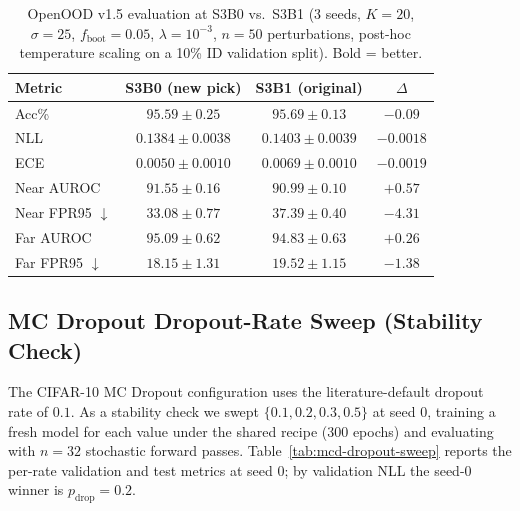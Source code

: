 \begin{table}[h]
\centering
\caption{OpenOOD v1.5 evaluation at S3B0 vs.\ S3B1 (3 seeds, $K = 20$,
$\sigma = 25$, $f_{\text{boot}} = 0.05$, $\lambda = 10^{-3}$, $n = 50$
perturbations, post-hoc temperature scaling on a 10\% ID validation split).
Bold = better.}
\label{tab:pnc-s3b0-vs-s3b1-ood}
\small
\begin{tabular}{l c c c}
\toprule
Metric & S3B0 (new pick) & S3B1 (original) & $\Delta$ \\
\midrule
Acc\%        & $95.59 \pm 0.25$  & $\mathbf{95.69 \pm 0.13}$    & $-0.09$ \\
NLL          & $\mathbf{0.1384 \pm 0.0038}$ & $0.1403 \pm 0.0039$ & $-0.0018$ \\
ECE          & $\mathbf{0.0050 \pm 0.0010}$ & $0.0069 \pm 0.0010$ & $-0.0019$ \\
Near AUROC   & $\mathbf{91.55 \pm 0.16}$    & $90.99 \pm 0.10$    & $+0.57$ \\
Near FPR95 $\downarrow$ & $\mathbf{33.08 \pm 0.77}$ & $37.39 \pm 0.40$ & $-4.31$ \\
Far AUROC    & $\mathbf{95.09 \pm 0.62}$    & $94.83 \pm 0.63$    & $+0.26$ \\
Far FPR95 $\downarrow$  & $\mathbf{18.15 \pm 1.31}$ & $19.52 \pm 1.15$ & $-1.38$ \\
\bottomrule
\end{tabular}
\end{table}

\subsection{MC Dropout Dropout-Rate Sweep (Stability Check)}
\label{app:mcd-sweep}

The CIFAR-10 MC Dropout configuration uses the literature-default dropout
rate of $0.1$. As a stability check we swept $\{0.1, 0.2, 0.3, 0.5\}$ at
seed 0, training a fresh model for each value under the shared recipe
(300 epochs) and evaluating with $n = 32$ stochastic forward passes.
Table~\ref{tab:mcd-dropout-sweep} reports the per-rate validation and test
metrics at seed 0; by validation NLL the seed-0 winner is $p_{\text{drop}} = 0.2$.

